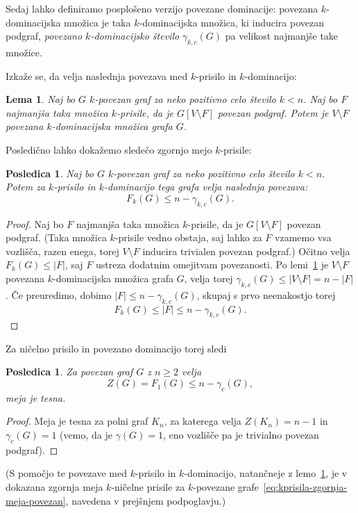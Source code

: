 \documentclass[12pt,a4paper,twoside]{article}
\theoremstyle{definition} %
\theoremstyle{plain} %
\newtheorem{lema}[definicija]{Lema}
\newtheorem{posledica}[definicija]{Posledica}
\numberwithin{equation}{section}  %
\begin{document}
Sedaj lahko definiramo posplošeno verzijo povezane dominacije: povezana $k$-dominacijska množica je taka $k$-dominacijska množica, ki inducira povezan podgraf, \emph{povezano $k$-dominacijsko število} $\gamma_{k,c}(G)$ pa velikost najmanjše take množice.

Izkaže se, da velja naslednja povezava med $k$-prisilo in $k$-dominacijo:
\begin{lema}{{\cite[lema 4.1]{amos2015kforcing}}}
    \label{lem:k-prisila-povezana-k-dominacija}
    Naj bo $G$ $k$-povezan graf za neko pozitivno celo število $k < n$. Naj bo $F$ najmanjša taka množica $k$-prisile, da je $G[V \setminus F]$ povezan podgraf. Potem je $V \setminus F$ povezana $k$-dominacijska množica grafa $G$.
\end{lema}
Posledično lahko dokažemo sledečo zgornjo mejo $k$-prisile:
\begin{posledica}{{\cite[posledica 4.2]{amos2015kforcing}}}
    Naj bo $G$ $k$-povezan graf za neko pozitivno celo število $k < n$. Potem za $k$-prisilo in $k$-dominacijo tega grafa velja naslednja povezava:
    \[ F_k(G) \leq n - \gamma_{k,c}(G). \]
\end{posledica}
\begin{proof}
    Naj bo $F$ najmanjša taka množica $k$-prisile, da je $G[V \setminus F]$ povezan podgraf. (Taka množica $k$-prisile vedno obstaja, saj lahko za $F$ vzamemo vsa vozlišča, razen enega, torej $V \setminus F$ inducira trivialen povezan podgraf.) Očitno velja $F_k(G) \leq |F|$, saj $F$ ustreza dodatnim omejitvam povezanosti.
    Po lemi~\ref{lem:k-prisila-povezana-k-dominacija} je $V \setminus F$ povezana $k$-dominacijska množica grafa $G$, velja torej $\gamma_{k, c}(G) \leq |V \setminus F| = n - |F|$. Če preuredimo, dobimo $|F| \leq n - \gamma_{k, c}(G)$, skupaj s prvo neenakostjo torej
    \[ F_k(G) \leq |F| \leq  n - \gamma_{k, c}(G).\]
\end{proof}

Za ničelno prisilo in povezano dominacijo torej sledi
\begin{posledica}
    Za povezan graf $G$ z $n \geq 2$ velja
    \[ Z(G) = F_1(G) \leq n - \gamma_c(G), \]
    meja je tesna.
\end{posledica}
\begin{proof}
    Meja je tesna za polni graf $K_n$, za katerega velja $Z(K_n) = n-1$ in $\gamma_c(G) = 1$ (vemo, da je $\gamma(G) = 1$, eno vozlišče pa je trivialno povezan podgraf).
\end{proof}

(S pomočjo te povezave med $k$-prisilo in $k$-dominacijo, natančneje z lemo~\ref{lem:k-prisila-povezana-k-dominacija}, je v~\cite{amos2015kforcing} dokazana zgornja meja $k$-ničelne prisile za $k$-povezane grafe~\eqref{eq:kprisila-zgornja-meja-povezan}, navedena v prejšnjem podpoglavju.)
\end{document}
